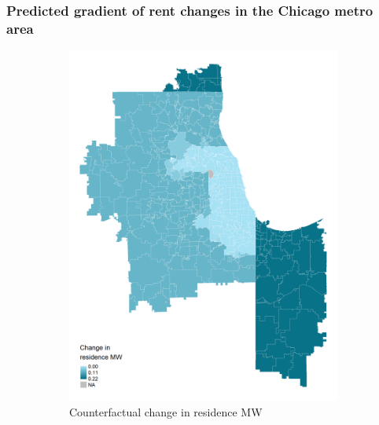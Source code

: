\documentclass[aspectratio=169, t]{beamer}
\begin{document}
\begin{frame}
    \frametitle{Predicted gradient of rent changes in the Chicago metro area}
    \begin{figure}
        \centering
        \begin{subfigure}{0.33\textwidth}
            \includegraphics[width = 0.99\textwidth]{counterfactuals/output/chicago_d_mw_res.png}
            \caption*{Counterfactual change in residence MW}
        \end{subfigure}%
        \begin{subfigure}{0.33\textwidth}

\end{subfigure}
\end{figure}
\end{frame}
\end{document}
